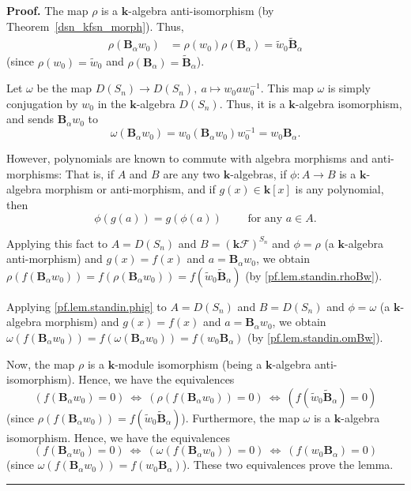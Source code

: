 \documentclass[12pt]{article}
\theoremstyle{definition}%
\theoremstyle{definition}%
\theoremstyle{remark}%
\newcommand{\tup}[1]{\left( #1 \right)}
\newcommand{\sbr}[1]{\left[ #1 \right]} %
\newcommand{\kk}{\mathbf{k}}
\newcommand{\kf}{\kk\mathcal{F}}
\newcommand{\kfsn}{\left(\kf\right)^{S_n}}
\newcommand{\dsn}{D\left(S_n\right)}
\newcommand{\BBa}{\mathbf{B}_{\alpha}}
\newcommand{\BBta}{\widetilde{\mathbf{B}}_{\alpha}}
\newcommand{\wo}{w_0} %
\newcommand{\wotil}{\widetilde{w}_0}
\newenvironment{proof}[1][Proof]{\noindent\textbf{#1.} }{\ \rule{0.5em}{0.5em}}
\begin{document}
\begin{proof}
The map $\rho$ is a $\kk$-algebra anti-isomorphism
(by Theorem~\ref{dsn_kfsn_morph}).
Thus,
\begin{align}
\rho\tup{\BBa\wo}
& = \rho\tup{\wo} \rho\tup{\BBa}
= \wotil \BBta
\label{pf.lem.standin.rhoBw}
\end{align}
(since $\rho\tup{\wo} = \wotil$ and
$\rho\tup{\BBa} = \BBta$).

Let $\omega$ be the map $\dsn\to\dsn, \ a \mapsto \wo a \wo^{-1}$.
This map $\omega$ is simply conjugation by $\wo$ in the
$\kk$-algebra $\dsn$.
Thus, it is a $\kk$-algebra isomorphism, and sends $\BBa\wo$
to
\begin{equation}
\omega\tup{\BBa\wo}
= \wo\tup{\BBa\wo}\wo^{-1} = \wo\BBa .
\label{pf.lem.standin.omBw}
\end{equation}

However, polynomials are known to commute with algebra
morphisms and anti-morphisms:
That is, if $A$ and $B$ are any two $\kk$-algebras,
if $\phi : A \to B$ is a $\kk$-algebra morphism or
anti-morphism, and if $g\tup{x} \in \kk\sbr{x}$ is any
polynomial, then
\begin{equation}
\phi\tup{g\tup{a}} = g\tup{\phi\tup{a}}
\qquad
\text{ for any } a \in A .
\label{pf.lem.standin.phig}
\end{equation}

Applying this fact to $A = \dsn$ and $B = \kfsn$ and
$\phi = \rho$ (a $\kk$-algebra anti-morphism) and
$g\tup{x} = f\tup{x}$ and $a = \BBa\wo$, we obtain
$\rho\tup{f\tup{\BBa\wo}} = f\tup{\rho\tup{\BBa\wo}}
= f\tup{\wotil \BBta}$ (by \eqref{pf.lem.standin.rhoBw}).

Applying \eqref{pf.lem.standin.phig} to $A = \dsn$ and
$B = \dsn$ and $\phi = \omega$ (a $\kk$-algebra morphism) and
$g\tup{x} = f\tup{x}$ and $a = \BBa\wo$, we obtain
$\omega\tup{f\tup{\BBa\wo}} = f\tup{\omega\tup{\BBa\wo}}
= f\tup{\wo\BBa}$ (by \eqref{pf.lem.standin.omBw}).

Now, the map $\rho$ is a $\kk$-module isomorphism
(being a $\kk$-algebra anti-isomorphism).
Hence, we have the equivalences
\[
\tup{f\tup{\BBa \wo} = 0}
\ \Longleftrightarrow\ %
\tup{\rho\tup{f\tup{\BBa\wo}} = 0}
\ \Longleftrightarrow\ %
\tup{f\tup{\wotil \BBta} = 0}
\]
(since $\rho\tup{f\tup{\BBa\wo}} = f\tup{\wotil \BBta}$).
Furthermore, the map $\omega$ is a $\kk$-algebra
isomorphism. Hence, we have the equivalences
\[
\tup{f\tup{\BBa \wo} = 0}
\ \Longleftrightarrow\ %
\tup{\omega\tup{f\tup{\BBa\wo}} = 0}
\ \Longleftrightarrow\ %
\tup{f\tup{\wo \BBa} = 0}
\]
(since $\omega\tup{f\tup{\BBa\wo}} = f\tup{\wo \BBa}$).
These two equivalences prove the lemma.
\end{proof}
\end{document}
